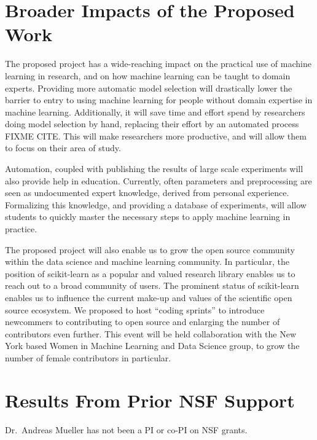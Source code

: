 \section{Broader Impacts of the Proposed Work}
The proposed project has a wide-reaching impact on the practical use of
machine learning in research, and on how machine learning can be taught to
domain experts.
Providing more automatic model selection will drastically lower the barrier
to entry to using machine learning for people without domain expertise
in machine learning.
Additionally, it will save time and effort spend by researchers doing
model selection by hand, replacing their effort by an automated process FIXME CITE\@.
This will make researchers more productive, and will allow them to focus
on their area of study.

Automation, coupled with publishing the results of large scale experiments will
also provide help in education. Currently, often parameters and
preprocessing are seen as undocumented expert knowledge, derived from personal experience.
Formalizing this knowledge, and providing a database of experiments,
will allow students to quickly master the necessary steps to apply
machine learning in practice.

The proposed project will also enable us to grow the open source community
within the data science and machine learning community.
In particular, the position of scikit-learn as a popular and valued
research library enables us to reach out to a broad community of users.
The prominent status of scikit-learn enables us to influence
the current make-up and values of the scientific open source ecosystem.
We proposed to host ``coding sprints'' to introduce
newcommers to contributing to open source and enlarging the
number of contributors even further. This event will be held collaboration with
the New York based Women in Machine Learning and Data Science group, to grow
the number of female contributors in particular. 


\section{Results From Prior NSF Support}
Dr.\ Andreas Mueller has not been a PI or co-PI on NSF grants.


